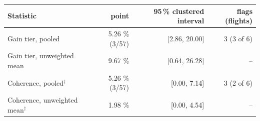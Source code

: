 \begin{tabular}{lrrr}
\toprule
Statistic & point & 95\,\% clustered interval & flags (flights) \\
\midrule
Gain tier, pooled & 5.26 \% (3/57) & [2.86, 20.00] & 3 (3 of 6) \\
Gain tier, unweighted mean & 9.67 \% & [0.64, 26.28] & -- \\
\midrule
Coherence, pooled$^\dagger$ & 5.26 \% (3/57) & [0.00, 7.14] & 3 (2 of 6) \\
Coherence, unweighted mean$^\dagger$ & 1.98 \% & [0.00, 4.54] & -- \\
\bottomrule
\end{tabular}
